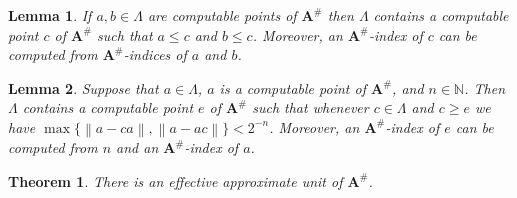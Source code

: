 \documentclass[10pt,a4paper]{amsart}
\newtheorem{lemma}{Lemma}
\newtheorem{theorem}{Theorem}
\newcommand{\boldA}{\mathbf{A}}
\newcommand{\norm}[1]{\left\| #1 \right\|}
\begin{document}
\begin{lemma}\label{lemma:ComputableApproxUnitDirected}
If $a, b \in \Lambda$ are computable points of $\boldA^\#$ then $\Lambda$ contains a computable point $c$ of $\boldA^\#$ such that $a \leq c$ and $b \leq c$.  Moreover, an $\boldA^\#$-index of $c$ can be computed from $\boldA^\#$-indices of $a$ and $b$.
\end{lemma}

\begin{lemma}\label{lemma:ComputableApproxUnitOneStep}
Suppose that $a \in \Lambda$, $a$ is a computable point of $\boldA^\#$, and $n \in \mathbb{N}$.  Then $\Lambda$ contains a computable point $e$ of $\boldA^\#$ such that whenever $c \in \Lambda$ and $c \geq e$ we have $\max\{\norm{a-ca}, \norm{a-ac}\} < 2^{-n}$.  Moreover, an $\boldA^\#$-index of $e$ can be computed from $n$ and an $\boldA^\#$-index of $a$.
\end{lemma}

\begin{theorem}\label{thm:ApproximateUnit}
There is an effective approximate unit of $\boldA^\#$.
\end{theorem}
\end{document}
